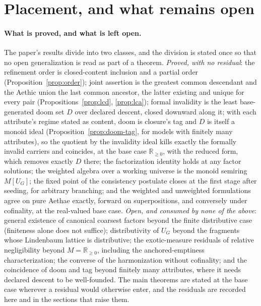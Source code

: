 \section{Placement, and what remains open}
\label{sec:placement}

\paragraph{What is proved, and what is left open.} The paper's results divide into two classes, and the division is stated once so that no open generalization is read as part of a theorem. \emph{Proved, with no residual}: the refinement order is closed-content inclusion and a partial order (Proposition~\ref{prop:order}); joint assertion is the greatest common descendant and the Aethic union the last common ancestor, the latter existing and unique for every pair (Propositions~\ref{prop:lcd}, \ref{prop:lca}); formal invalidity is the least base-generated doom set $D$ over declared descent, closed downward along it; with each attribute's regime stated as content, doom is closure's tag and $D$ is itself a monoid ideal (Proposition~\ref{prop:doom-tag}, for models with finitely many attributes), so the quotient by the invalidity ideal kills exactly the formally invalid carriers and coincides, at the base case $\mathbb{R}_{\ge 0}$, with the reduced form, which removes exactly $D$ there; the factorization identity holds at any factor solutions; the weighted algebra over a working universe is the monoid semiring $M[U_G]$; the fixed point of the consistency postulate closes at the first stage after seeding, for arbitrary branching; and the weighted and unweighted formulations agree on pure Aethae exactly, forward on superpositions, and conversely under cofinality, at the real-valued base case. \emph{Open, and consumed by none of the above}: general existence of canonical coarsest factors beyond the finite distributive case (finiteness alone does not suffice); distributivity of $U_G$ beyond the fragments whose Lindenbaum lattice is distributive; the exotic-measure residuals of relative negligibility beyond $M = \mathbb{R}_{\ge 0}$, including the anchored-emptiness characterization; the converse of the harmonization without cofinality; and the coincidence of doom and tag beyond finitely many attributes, where it needs declared descent to be well-founded. The main theorems are stated at the base case wherever a residual would otherwise enter, and the residuals are recorded here and in the sections that raise them.
